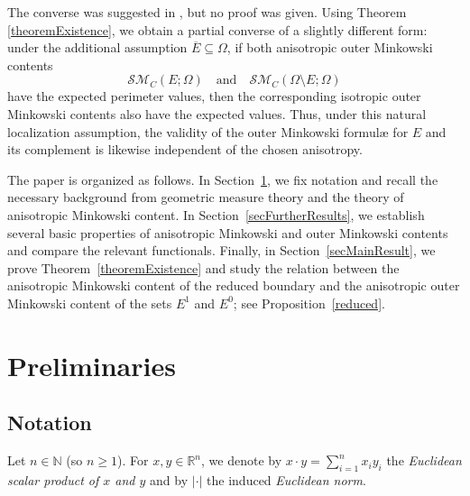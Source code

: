\documentclass[pdflatex,sn-mathphys-num]{sn-jnl}
\theoremstyle{plain}
\theoremstyle{definition}
\begin{document}
The converse was suggested in \cite[Remark 3.5]{chambolle}, but no proof was given. Using Theorem \ref{theoremExistence}, we obtain a partial converse of a slightly different form: under the additional assumption $\overline{E}\subseteq\Omega$, if both anisotropic outer Minkowski contents
\[
\mathcal{SM}_C(E;\Omega)
\quad\text{and}\quad
\mathcal{SM}_C(\Omega\setminus E;\Omega)
\]
have the expected perimeter values, then the corresponding isotropic outer Minkowski contents also have the expected values. Thus, under this natural localization assumption, the validity of the outer Minkowski formul{\ae} for $E$ and its complement is likewise independent of the chosen anisotropy.

The paper is organized as follows. In Section~\ref{secPrelim}, we fix notation and recall the necessary background from geometric measure theory and the theory of anisotropic Minkowski content. In Section~\ref{secFurtherResults}, we establish several basic properties of anisotropic Minkowski and outer Minkowski contents and compare the relevant functionals. Finally, in Section~\ref{secMainResult}, we prove Theorem~\ref{theoremExistence} and study the relation between the anisotropic Minkowski content of the reduced boundary and the anisotropic outer Minkowski content of the sets $E^1$ and $E^0$; see Proposition~\ref{reduced}.

\section{Preliminaries}
\label{secPrelim}
\subsection{Notation}
 Let $n\in\mathbb{N}$ (so $n\geq1$). For $x, y\in\mathbb{R}^n$, we denote by $x\cdot y=\sum_{i=1}^{n}x_i y_i$ the \textit{Euclidean scalar product of $x$ and $y$} and by $|\cdot|$ the induced \emph{Euclidean norm}.
\end{document}
